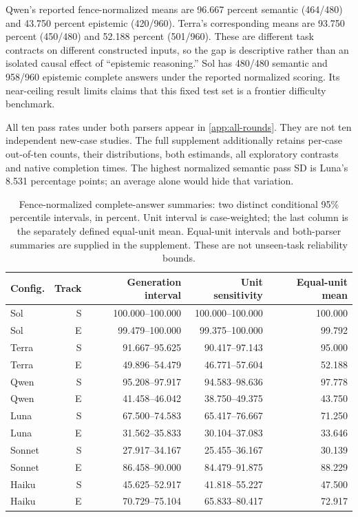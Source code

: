 \documentclass[a4paper,preprint,12pt,numbers,nopreprintline]{elsarticle}
\begin{document}
Qwen's reported fence-normalized means are 96.667 percent semantic (464/480) and 43.750 percent epistemic (420/960). Terra's corresponding means are 93.750 percent (450/480) and 52.188 percent (501/960). These are different task contracts on different constructed inputs, so the gap is descriptive rather than an isolated causal effect of ``epistemic reasoning.'' Sol has 480/480 semantic and 958/960 epistemic complete answers under the reported normalized scoring. Its near-ceiling result limits claims that this fixed test set is a frontier difficulty benchmark.

All ten pass rates under both parsers appear in \ref{app:all-rounds}. They are not ten independent new-case studies. The full supplement additionally retains per-case out-of-ten counts, their distributions, both estimands, all exploratory contrasts and native completion times. The highest normalized semantic pass SD is Luna's 8.531 percentage points; an average alone would hide that variation.
\begin{table}[htbp]\centering\scriptsize
\caption{Fence-normalized complete-answer summaries: two distinct conditional 95\% percentile intervals, in percent. Unit interval is case-weighted; the last column is the separately defined equal-unit mean. Equal-unit intervals and both-parser summaries are supplied in the supplement. These are not unseen-task reliability bounds.}\label{tab:ten-pass-intervals}
\setlength{\tabcolsep}{3pt}
\begin{tabular}{lrrrr}\toprule
Config. & Track & Generation interval & Unit sensitivity & Equal-unit mean\\\midrule
Sol & S & 100.000--100.000 & 100.000--100.000 & 100.000\\
Sol & E & 99.479--100.000 & 99.375--100.000 & 99.792\\
Terra & S & 91.667--95.625 & 90.417--97.143 & 95.000\\
Terra & E & 49.896--54.479 & 46.771--57.604 & 52.188\\
Qwen & S & 95.208--97.917 & 94.583--98.636 & 97.778\\
Qwen & E & 41.458--46.042 & 38.750--49.375 & 43.750\\
Luna & S & 67.500--74.583 & 65.417--76.667 & 71.250\\
Luna & E & 31.562--35.833 & 30.104--37.083 & 33.646\\
Sonnet & S & 27.917--34.167 & 25.455--36.167 & 30.139\\
Sonnet & E & 86.458--90.000 & 84.479--91.875 & 88.229\\
Haiku & S & 45.625--52.917 & 41.818--55.227 & 47.500\\
Haiku & E & 70.729--75.104 & 65.833--80.417 & 72.917\\
\bottomrule\end{tabular}
\end{table}
\end{document}
